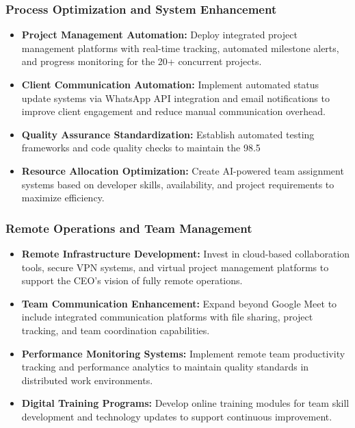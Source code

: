 \documentclass[12pt,a4paper]{article}
\begin{document}
\subsubsection{Process Optimization and System Enhancement}

\begin{itemize}
    \item \textbf{Project Management Automation:} Deploy integrated project management platforms with real-time tracking, automated milestone alerts, and progress monitoring for the 20+ concurrent projects.
    
    \item \textbf{Client Communication Automation:} Implement automated status update systems via WhatsApp API integration and email notifications to improve client engagement and reduce manual communication overhead.
    
    \item \textbf{Quality Assurance Standardization:} Establish automated testing frameworks and code quality checks to maintain the 98.5%
    
    \item \textbf{Resource Allocation Optimization:} Create AI-powered team assignment systems based on developer skills, availability, and project requirements to maximize efficiency.
\end{itemize}

\subsubsection{Remote Operations and Team Management}

\begin{itemize}
    \item \textbf{Remote Infrastructure Development:} Invest in cloud-based collaboration tools, secure VPN systems, and virtual project management platforms to support the CEO's vision of fully remote operations.
    
    \item \textbf{Team Communication Enhancement:} Expand beyond Google Meet to include integrated communication platforms with file sharing, project tracking, and team coordination capabilities.
    
    \item \textbf{Performance Monitoring Systems:} Implement remote team productivity tracking and performance analytics to maintain quality standards in distributed work environments.
    
    \item \textbf{Digital Training Programs:} Develop online training modules for team skill development and technology updates to support continuous improvement.
\end{itemize}
\end{document}
